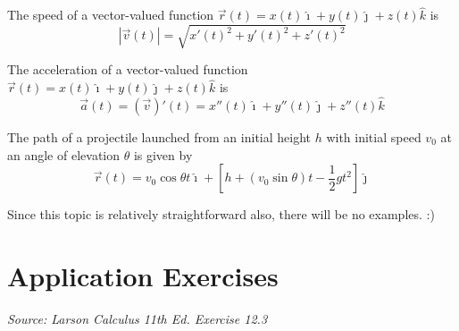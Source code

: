 \documentclass{report}
\begin{document}
The speed of a vector-valued function $\vec{r}(t) = x(t)\hat{\imath} +
    y(t)\hat{\jmath} + z(t)\hat{k}$ is \[|\vec{v}(t)| = \sqrt{x'(t)^2 + y'(t)^2 + z'(t)^2}\]

The acceleration of a vector-valued function $\vec{r}(t) = x(t)\hat{\imath} +
    y(t)\hat{\jmath} + z(t)\hat{k}$ is \[\vec{a}(t) = (\vec{v})'(t) = x''(t)\hat{\imath} + y''(t)\hat{\jmath} + z''(t)\hat{k}\]

The path of a projectile launched from an initial height $h$ with initial speed
$v_0$ at an angle of elevation $\theta$ is given by \[\vec{r}(t) = v_0\cos\theta t\hat{\imath} + \left[h + (v_0\sin\theta) t - \frac{1}{2}gt^2\right]\hat{\jmath}\]

Since this topic is relatively straightforward also, there will be no examples.
:)

\newpage

\section*{Application Exercises}
\textit{Source: Larson Calculus 11th Ed. Exercise 12.3}
\end{document}
